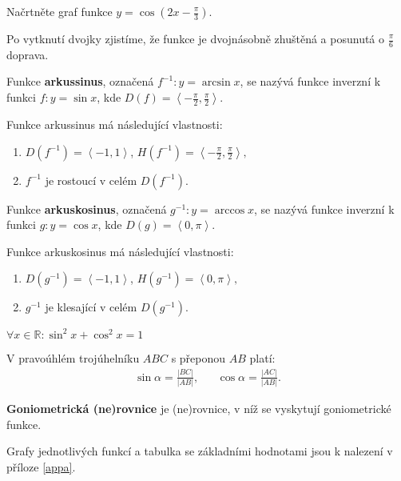 \begin{priklad}
Načrtněte graf funkce $y=\cos (2x-\frac{\pi}{3}).$
\end{priklad}

\begin{reseni}
Po vytknutí dvojky zjistíme, že funkce je dvojnásobně zhuštěná a posunutá o $\frac{\pi}{6}$ doprava.
\end{reseni}

\begin{definition}
Funkce \textbf{arkussinus}, označená $f^{-1}: y=\arcsin x$, se nazývá funkce inverzní
k funkci $f: y=\sin x$, kde $D(f)=\left < -\frac{\pi}{2},\frac{\pi}{2} \right >$.
\end{definition}
\begin{pozn}
    Funkce arkussinus má následující vlastnosti:
    \begin{enumerate}
    \item $D(f^{-1}) = \left < -1, 1 \right >$, $H(f^{-1}) = \left < -\frac{\pi}{2},\frac{\pi}{2} \right >,$
    \item $f^{-1}$ je rostoucí v celém $D(f^{-1}).$
    \end{enumerate}
\end{pozn}


\begin{definition}
Funkce \textbf{arkuskosinus}, označená $g^{-1}: y=\arccos x$, se nazývá funkce inverzní
k funkci $g: y=\cos x$, kde $D(g)=\left < 0,\pi \right >$.
\end{definition}
\begin{pozn}
Funkce arkuskosinus má následující vlastnosti:
\begin{enumerate}
    \item $D(g^{-1}) = \left < -1, 1 \right >$, $H(g^{-1}) = \left < 0, \pi \right >,$
    \item $g^{-1}$ je klesající v celém $D(g^{-1}).$
\end{enumerate}
\end{pozn}

\begin{veta}
  $\forall x \in \mathbb{R}:\sin^2 x + \cos^2 x = 1$
\end{veta}

\begin{veta}
    V pravoúhlém trojúhelníku $ABC$ s přeponou $AB$ platí:
    \begin{align*}
        \sin \alpha = \frac{ |BC| }{ |AB| }, & & \cos \alpha = \frac{|AC|}{|AB|}.
    \end{align*}
\end{veta}

\begin{pozn}
    \textbf{Goniometrická (ne)rovnice} je (ne)rovnice, v níž se vyskytují goniometrické funkce.
\end{pozn}

\begin{pozn}
    Grafy jednotlivých funkcí a tabulka se základními hodnotami jsou k nalezení
    v příloze \ref{appa}.
\end{pozn}
